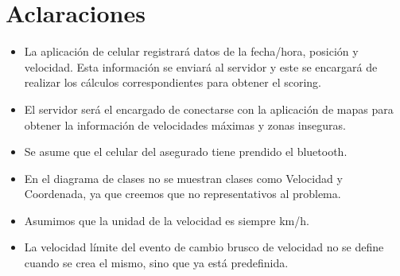 \section{Aclaraciones}

\begin{itemize}
\item La aplicación de celular registrará datos de la fecha/hora, posición y velocidad. Esta información se enviará al servidor y este se encargará de realizar los cálculos correspondientes para obtener el scoring.
\item El servidor será el encargado de conectarse con la aplicación de mapas para obtener la información de velocidades máximas y zonas inseguras.
\item Se asume que el celular del asegurado tiene prendido el bluetooth.
\item En el diagrama de clases no se muestran clases como Velocidad y Coordenada, ya que creemos que no representativos al problema.
\item Asumimos que la unidad de la velocidad es siempre km/h.
\item La velocidad límite del evento de cambio brusco de velocidad no se define cuando se crea el mismo, sino que ya está predefinida.
\end{itemize}
